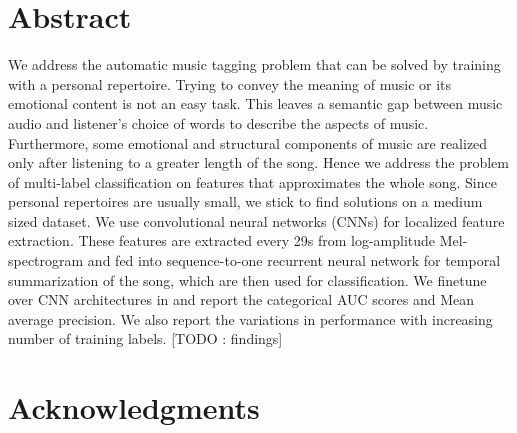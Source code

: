 \documentclass{book}
\begin{document}
\aicescoverpage


\section*{Abstract}

We address the automatic music tagging problem that can be solved by training with a personal repertoire. Trying to convey the meaning of music or its emotional content is not an easy task. This leaves a  semantic gap between music audio and listener's choice of words to describe the aspects of music. Furthermore, some emotional and structural components of music are realized only after listening to a greater length of the song. Hence we address the problem of multi-label classification on features that approximates the whole song. Since personal repertoires are usually small, we stick to find solutions on a medium sized dataset. We use convolutional neural networks (CNNs) for localized feature extraction. These features are extracted every 29s from log-amplitude Mel-spectrogram and fed into sequence-to-one recurrent neural network for temporal summarization of the song, which are then used for classification. We finetune over CNN architectures in \cite{choi_cnn} \cite{choi_crnn} and report the categorical AUC scores and Mean average precision. We also report the variations in performance with increasing number of training labels. [TODO : findings]
\vspace{5cm}


\newpage

\section*{\bf Acknowledgments}

\tableofcontents
\end{document}
